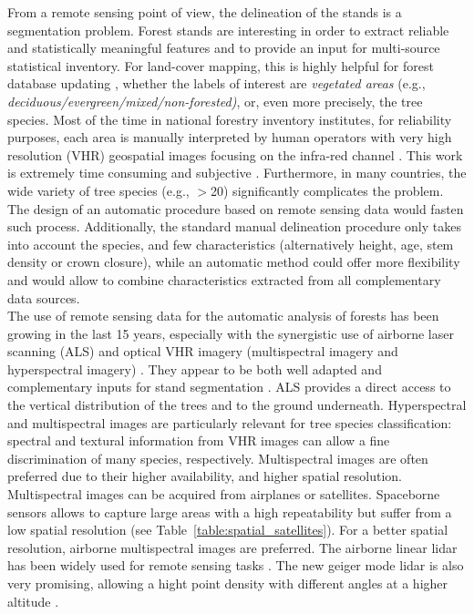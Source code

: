 From a remote sensing point of view, the delineation of the stands is a segmentation problem. Forest stands are interesting in order to extract reliable and statistically meaningful features and to provide an input for multi-source statistical inventory. For land-cover mapping, this is highly helpful for forest database updating \citep{Kim09}, whether the labels of interest are \textit{vegetated areas} {(e.g., \textit{deciduous/evergreen/mixed/non-forested)}}, or, even more precisely, the tree species. Most of the time in national forestry inventory institutes, for reliability purposes, each area is manually interpreted by human operators with very high resolution (VHR) geospatial images focusing on the infra-red channel \citep{Malatamo}. This work is extremely time consuming and subjective \citep{Wulder2008}. Furthermore, in many countries, the wide variety of tree species (e.g., $>$20) significantly complicates the problem. The design of an automatic procedure based on remote sensing data would fasten such process. Additionally, the standard manual delineation procedure only takes into account the species, and few characteristics (alternatively height, age, stem density or crown closure), while an automatic method could offer more flexibility and would allow to combine characteristics extracted from all complementary data sources. \\

The use of remote sensing data for the automatic analysis of forests has been growing in the last 15 years, especially with the synergistic use of airborne laser scanning (ALS) and optical VHR imagery (multispectral imagery and hyperspectral imagery) \citep{torabzadeh2014fusion,White2016CJRS}. They appear to be both well adapted and complementary inputs for stand segmentation \citep{dalponte2012tree,dalponte2015delineation,7500049}. ALS provides a direct access to the vertical distribution of the trees and to the ground underneath. Hyperspectral and multispectral images are particularly relevant for tree species classification: spectral and textural information from VHR  images can allow a fine discrimination of many species, respectively. Multispectral images are often preferred due to their higher availability, and higher spatial resolution. Multispectral images can be acquired from airplanes or satellites. Spaceborne sensors allows to capture large areas with a high repeatability but suffer from a low spatial resolution (see Table~\ref{table:spatial_satellites}). For a better spatial resolution, airborne multispectral images are preferred. The airborne linear lidar has been widely used for remote sensing tasks \citep{lim2003lidar, shan2008topographic, vosselman2010airborne}. The new geiger mode lidar is also very promising, allowing a hight point density with different angles at a higher altitude \citep{ullrich2016linear}. \\

